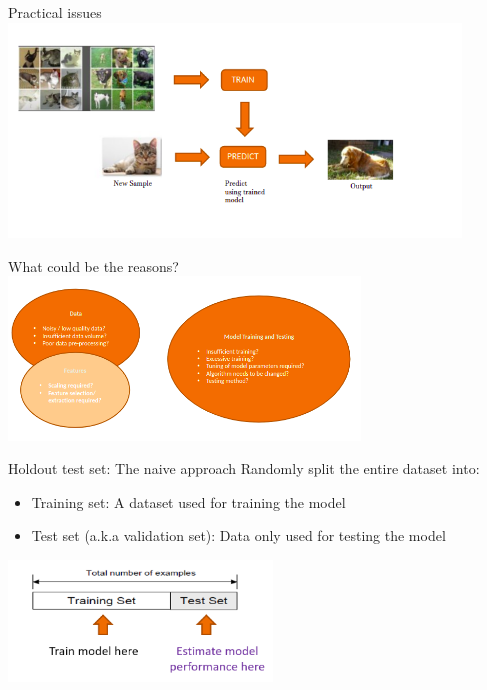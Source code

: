 \documentclass[aspectratio=169,14pt,usenames,dvipsnames]{beamer}
\begin{document}
\begin{frame}[t]{Practical issues}
\centering
\includegraphics[width=0.9\textwidth, height=0.6\textheight]{Images/AIML_MLPrinciples_IMG5.png}
\end{frame}

\begin{frame}[t]{What could be the reasons?}
\centering
\includegraphics[width=0.7\textwidth, height=0.5\textheight]{Images/AIML_MLPrinciples_IMG6.png}
\end{frame}


\begin{frame}[t]{Holdout test set: The naive approach}
Randomly split the entire dataset into:
\begin{itemize}
\item \alert{Training set:} A dataset used for training the model	
\item \alert{Test set (a.k.a validation set):} Data only used for testing the model
\end{itemize}
\begin{center}
\includegraphics[width=7cm]{Images/AIML_MLPrinciples_IMG7.png}
\end{center}
\end{frame}
\end{document}
